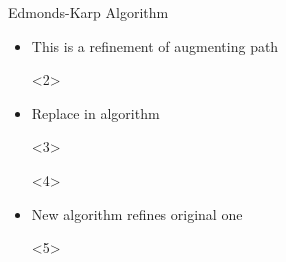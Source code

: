 \documentclass[fleqn]{beamer}
\begin{document}
{\begin{frame}[t]{Edmonds-Karp Algorithm}
\begin{itemize}
\begin{onlyenv}
      \isasnip\snipshortest
    \end{onlyenv}
   \item<2-> This is a refinement of augmenting path
    \begin{onlyenv}<2>
      \vspace*{1em}
      
      \isasnip\snipsrefine
    \end{onlyenv}
   \item<3-> Replace in algorithm
    \begin{onlyenv}<3>
      \vspace*{1em}
      
      \isasnip\snipalgoorig
    \end{onlyenv}
    \begin{onlyenv}<4>
      \vspace*{1em}
      
      \isasnip\snipalgorepl
    \end{onlyenv}
  
   \item<5-> New algorithm refines original one
    \begin{onlyenv}<5>
      \vspace*{1em}
      
      \isasnip\snipalgoref
    \end{onlyenv}

  \end{itemize}
\end{frame}
}
\end{document}
